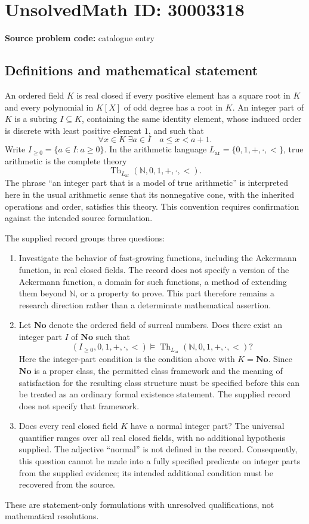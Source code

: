 \documentclass[11pt]{article}
\newcommand{\N}{\mathbb{N}}
\begin{document}
\section*{UnsolvedMath ID: 30003318}
\textbf{Source problem code:} catalogue entry
\subsection{Definitions and mathematical statement}
An ordered field \(K\) is real closed if every positive element has a square root in \(K\) and every polynomial in \(K[X]\) of odd degree has a root in \(K\). An integer part of \(K\) is a subring \(I\subseteq K\), containing the same identity element, whose induced order is discrete with least positive element \(1\), and such that
\[
\forall x\in K\;\exists a\in I\quad a\leq x<a+1.
\]
Write \(I_{\geq 0}=\{a\in I:a\geq 0\}\). In the arithmetic language \(L_{\mathrm{ar}}=\{0,1,+,\cdot,<\}\), true arithmetic is the complete theory
\[
\operatorname{Th}_{L_{\mathrm{ar}}}(\N,0,1,+,\cdot,<).
\]
The phrase ``an integer part that is a model of true arithmetic'' is interpreted here in the usual arithmetic sense that its nonnegative cone, with the inherited operations and order, satisfies this theory. This convention requires confirmation against the intended source formulation.

The supplied record groups three questions:
\begin{enumerate}
\item Investigate the behavior of fast-growing functions, including the Ackermann function, in real closed fields. The record does not specify a version of the Ackermann function, a domain for such functions, a method of extending them beyond \(\N\), or a property to prove. This part therefore remains a research direction rather than a determinate mathematical assertion.
\item Let \(\mathbf{No}\) denote the ordered field of surreal numbers. Does there exist an integer part \(I\) of \(\mathbf{No}\) such that
\[
(I_{\geq 0},0,1,+,\cdot,<)
\models
\operatorname{Th}_{L_{\mathrm{ar}}}(\N,0,1,+,\cdot,<)?
\]
Here the integer-part condition is the condition above with \(K=\mathbf{No}\). Since \(\mathbf{No}\) is a proper class, the permitted class framework and the meaning of satisfaction for the resulting class structure must be specified before this can be treated as an ordinary formal existence statement. The supplied record does not specify that framework.
\item Does every real closed field \(K\) have a normal integer part? The universal quantifier ranges over all real closed fields, with no additional hypothesis supplied. The adjective ``normal'' is not defined in the record. Consequently, this question cannot be made into a fully specified predicate on integer parts from the supplied evidence; its intended additional condition must be recovered from the source.
\end{enumerate}
These are statement-only formulations with unresolved qualifications, not mathematical resolutions.
\end{document}
